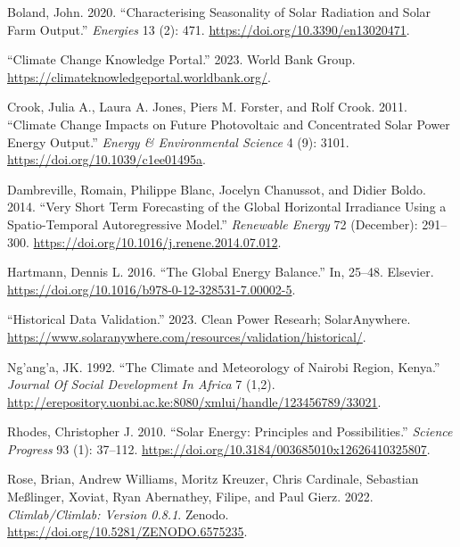 \documentclass[
  letterpaper,
  DIV=11,
  numbers=noendperiod]{scrartcl}
\newlength{\cslhangindent}
\newlength{\cslentryspacingunit} %
\newenvironment{CSLReferences}[2] %
 {%
  \setlength{\parindent}{0pt}
  \ifodd #1
  \let\oldpar\par
  \def\par{\hangindent=\cslhangindent\oldpar}
  \fi
  \setlength{\parskip}{#2\cslentryspacingunit}
 }%
 {}
\begin{document}
\hypertarget{refs}{}
\begin{CSLReferences}{1}{0}
\leavevmode{}%
Boland, John. 2020. {``Characterising Seasonality of Solar Radiation and
Solar Farm Output.''} \emph{Energies} 13 (2): 471.
\url{https://doi.org/10.3390/en13020471}.

\leavevmode{}%
{``Climate Change Knowledge Portal.''} 2023. World Bank Group.
\url{https://climateknowledgeportal.worldbank.org/}.

\leavevmode{}%
Crook, Julia A., Laura A. Jones, Piers M. Forster, and Rolf Crook. 2011.
{``Climate Change Impacts on Future Photovoltaic and Concentrated Solar
Power Energy Output.''} \emph{Energy \& Environmental Science} 4 (9):
3101. \url{https://doi.org/10.1039/c1ee01495a}.

\leavevmode{}%
Dambreville, Romain, Philippe Blanc, Jocelyn Chanussot, and Didier
Boldo. 2014. {``Very Short Term Forecasting of the Global Horizontal
Irradiance Using a Spatio-Temporal Autoregressive Model.''}
\emph{Renewable Energy} 72 (December): 291--300.
\url{https://doi.org/10.1016/j.renene.2014.07.012}.

\leavevmode{}%
Hartmann, Dennis L. 2016. {``The Global Energy Balance.''} In, 25--48.
Elsevier. \url{https://doi.org/10.1016/b978-0-12-328531-7.00002-5}.

\leavevmode{}%
{``Historical Data Validation.''} 2023. Clean Power Researh;
SolarAnywhere.
\url{https://www.solaranywhere.com/resources/validation/historical/}.

\leavevmode{}%
Ng'ang'a, JK. 1992. {``The Climate and Meteorology of Nairobi Region,
Kenya.''} \emph{Journal Of Social Development In Africa} 7 (1,2).
\url{http://erepository.uonbi.ac.ke:8080/xmlui/handle/123456789/33021}.

\leavevmode{}%
Rhodes, Christopher J. 2010. {``Solar Energy: Principles and
Possibilities.''} \emph{Science Progress} 93 (1): 37--112.
\url{https://doi.org/10.3184/003685010x12626410325807}.

\leavevmode{}%
Rose, Brian, Andrew Williams, Moritz Kreuzer, Chris Cardinale, Sebastian
Meßlinger, Xoviat, Ryan Abernathey, Filipe, and Paul Gierz. 2022.
\emph{Climlab/Climlab: Version 0.8.1}. Zenodo.
\url{https://doi.org/10.5281/ZENODO.6575235}.


\end{CSLReferences}
\end{document}
